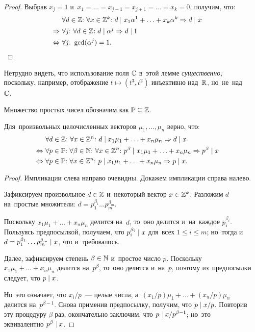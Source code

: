 \documentclass[a4paper,oneside]{article}
\begin{document}
\begin{proof}
  Выбрав $x_j = 1$ и~$x_1 = \ldots = x_{j - 1} = x_{j + 1} = \ldots = x_k = 0$, получим, что:
  \[
  \begin{aligned}[b]
                     & \forall d \in \mathbb{Z}{:}\ \forall x \in \mathbb{Z}^k{:}\ d \mid x_1 \alpha^1 + \ldots + x_k \alpha^k \Rightarrow d \mid x \\
        \Rightarrow\ & \forall j{:}\ \forall d \in \mathbb{Z}{:}\ d \mid \alpha^j \Rightarrow d \mid 1 \\
    \Leftrightarrow\ & \forall j{:}\ \gcd(\alpha^j) = 1.
  \end{aligned}
  \qedhere
  \]
\end{proof}

Нетрудно видеть, что использование поля $\mathbb{C}$ в~этой лемме \textit{существенно;} поскольку, например,
отображение $t \mapsto (t^3, t^2)$ инъективно над~$\mathbb{R}$, но~не~над~$\mathbb{C}$.

Множество простых чисел обозначим как $\mathbb{P} \subseteq \mathbb{Z}$.

\begin{lemma*}
  Для~произвольных целочисленных векторов $\mu_1, \ldots, \mu_n$ верно, что:
  \[
  \begin{aligned}
                     & \forall d \in \mathbb{Z}{:}\ \forall x \in \mathbb{Z}^n{:}\ d \mid x_1 \mu_1 + \ldots + x_n \mu_n \Rightarrow d \mid x \\
    \Leftrightarrow\ & \forall p \in \mathbb{P}{:}\ \forall \beta \in \mathbb{N}{:}\ \forall x \in \mathbb{Z}^n{:}\ p^\beta \mid x_1 \mu_1 + \ldots + x_n \mu_n \Rightarrow p^\beta \mid x \\
    \Leftrightarrow\ & \forall p \in \mathbb{P}{:}\ \forall x \in \mathbb{Z}^n{:}\ p \mid x_1 \mu_1 + \ldots + x_n \mu_n \Rightarrow p \mid x.
  \end{aligned}
  \]
\end{lemma*}

\begin{proof}
  Импликации слева направо очевидны. Докажем импликации справа налево.

  Зафиксируем произвольное $d \in \mathbb{Z}$ и~некоторый вектор $x \in \mathbb{Z}^k$.
  Разложим $d$ на~простые множители: $d = p_1^{\beta_1} \ldots p_m^{\beta_m}$.

  Поскольку $x_1 \mu_1 + \ldots + x_n \mu_n$ делится на~$d$, то~оно делится и~на~каждое $p_i^{\beta_i}$.
  Пользуясь предпосылкой, получаем, что $p_i^{\beta_i} \mid x$ для~всех $1 \leq i \leq m$;
  но~тогда и~$d = p_1^{\beta_1} \ldots p_m^{\beta_m} \mid x$, что и~требовалось.

  Далее, зафиксируем степень $\beta \in \mathbb{N}$ и~простое число $p$.
  Поскольку $x_1 \mu_1 + \ldots + x_n \mu_n$ делится на~$p^\beta$,
  то~оно делится и~на~$p$, поэтому из~предпосылки следует, что $p \mid x$.

  Но~это означает, что $x_i / p$~— целые числа, а~$(x_1 / p) \mu_1 + \ldots + (x_n / p) \mu_n$ делится на~$p^{\beta - 1}$.
  Снова применив предпосылку, получим, что $p \mid x / p$.
  Повторив эту процедуру $\beta$ раз, окончательно заключим, что $p \mid x / p^{\beta - 1}$;
  но~это эквивалентно $p^\beta \mid x$.
\end{proof}
\end{document}
